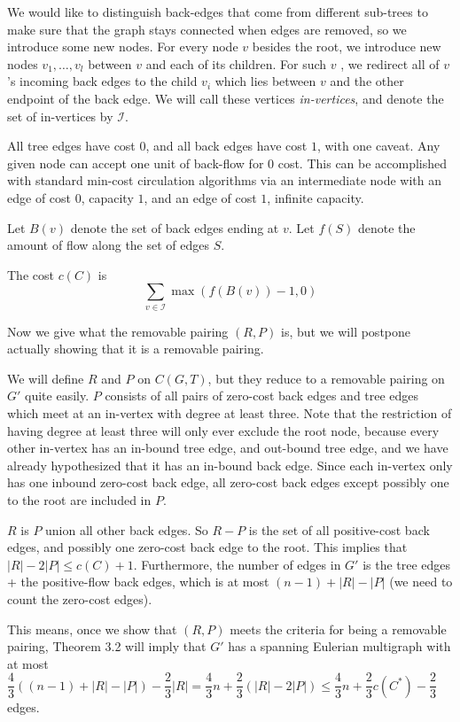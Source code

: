 \documentclass[12pt]{article}
\begin{document}
We would like to distinguish back-edges that come from different sub-trees to
make sure that the graph stays connected when edges are removed, so we introduce
some new nodes.  For every node $v$ besides the root, we introduce new nodes
$v_1, \ldots, v_l$ between $v$ and each of its children.  For such $v$ , we
redirect all of $v$'s incoming back edges to the child $v_i$ which lies between
$v$ and the other endpoint of the back edge.  We will call these vertices
\emph{in-vertices}, and denote the set of in-vertices by $\mathcal{I}$.

All tree edges have cost $0$, and all back edges have cost $1$, with one
caveat.  Any given node can accept one unit of back-flow for $0$ cost.  This
can be accomplished with standard min-cost circulation algorithms via an
intermediate node with an edge of cost $0$, capacity $1$, and an edge of cost
$1$, infinite capacity.  

Let $B(v)$ denote the set of back edges ending at $v$.  Let $f(S)$ denote the
amount of flow along the set of edges $S$.

The cost $c(C)$ is
\[
\sum_{v \in \mathcal{I}} \max ( f(B(v)) - 1, 0)
\]

Now we give what the removable pairing $(R, P)$ is, but we will postpone
actually showing that it is a removable pairing.  

We will define $R$ and $P$ on $C(G, T)$, but they reduce to a removable pairing
on $G'$ quite easily.  $P$ consists of all pairs of zero-cost back edges and
tree edges which meet at an in-vertex with degree at least three.  Note that the
restriction of having degree at least three will only ever exclude the root
node, because every other in-vertex has an in-bound tree edge, and out-bound
tree edge, and we have already hypothesized that it has an in-bound back edge.
Since each in-vertex only has one inbound zero-cost back edge, all zero-cost
back edges except possibly one to the root are included in $P$.

$R$ is $P$ union all other back edges.  So $R - P$ is the set of all positive-cost back
edges, and possibly one zero-cost back edge to the root.  This implies that $|R|
- 2|P| \le c(C) + 1$.  Furthermore, the number of edges in $G'$ is the tree
  edges + the positive-flow back edges, which is at most $ (n - 1) + |R| - |P|$
(we need to count the zero-cost edges).

This means, once we show that $(R, P)$ meets the criteria for being a removable
pairing, Theorem 3.2 will imply that $G'$ has a spanning Eulerian multigraph
with at most $\dfrac{4}{3}((n-1) + |R| - |P|) - \dfrac{2}{3} |R| = \dfrac{4}{3}n
+ \dfrac{2}{3}(|R| - 2|P|) \le \dfrac{4}{3} n + \dfrac{2}{3} c(C^*) -
\dfrac{2}{3}$ edges. 
\end{document}

